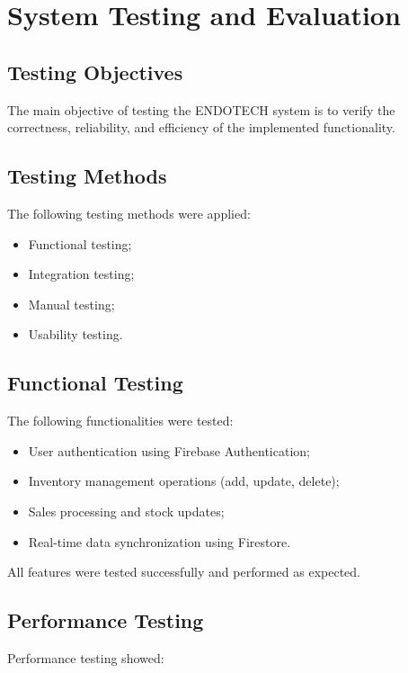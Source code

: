 \chapter{System Testing and Evaluation}

\section{Testing Objectives}

The main objective of testing the ENDOTECH system is to verify the correctness, reliability, and efficiency of the implemented functionality.

\section{Testing Methods}

The following testing methods were applied:

\begin{itemize}
    \item Functional testing;
    \item Integration testing;
    \item Manual testing;
    \item Usability testing.
\end{itemize}

\section{Functional Testing}

The following functionalities were tested:

\begin{itemize}
    \item User authentication using Firebase Authentication;
    \item Inventory management operations (add, update, delete);
    \item Sales processing and stock updates;
    \item Real-time data synchronization using Firestore.
\end{itemize}

All features were tested successfully and performed as expected.

\section{Performance Testing}

Performance testing showed:

